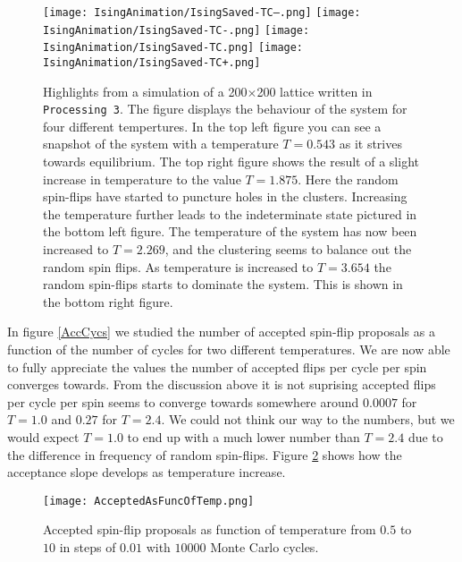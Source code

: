 \documentclass[twoside,utf8]{article}
\begin{document}
\begin{figure}[H]
\begin{center}
\texttt{[image: IsingAnimation/IsingSaved-TC--.png]}
\texttt{[image: IsingAnimation/IsingSaved-TC-.png]}
\texttt{[image: IsingAnimation/IsingSaved-TC.png]}
\texttt{[image: IsingAnimation/IsingSaved-TC+.png]}
\end{center}
\caption{
Highlights from a simulation of a 200$\times$200 lattice written in \texttt{Processing 3}. The figure displays the behaviour of the system for four different tempertures. In the top left figure you can see a snapshot of the system with a temperature $T=0.543$ as it strives towards equilibrium. The top right figure shows the result of a slight increase in temperature to the value $T=1.875$. Here the random spin-flips have started to puncture holes in the clusters. Increasing the temperature further leads to the indeterminate state pictured in the bottom left figure. The temperature of the system has now been increased to $T=2.269$, and the clustering seems to balance out the random spin flips. As temperature is increased to $T=3.654$ the random spin-flips starts to dominate the system. This is shown in the bottom right figure.
}
\label{Processing}
\end{figure}


\noindent
In figure \ref*{AccCycs} we studied the number of accepted spin-flip proposals as a function of the number of cycles for two different temperatures. We are now able to fully appreciate the values the number of accepted flips per cycle per spin converges towards. From the discussion above it is not suprising accepted flips per cycle per spin seems to converge towards somewhere around $0.0007$ for $T=1.0$ and $0.27$ for $T=2.4$. We could not think our way to the numbers, but we would expect $T=1.0$ to end up with a much lower number than $T=2.4$ due to the difference in frequency of random spin-flips. Figure \ref*{AcceptedAsFuncOfTemp} shows how the acceptance slope develops as temperature increase. 




\begin{figure}[H]
\begin{center}
\texttt{[image: AcceptedAsFuncOfTemp.png]}
\end{center}
\caption{
Accepted spin-flip proposals as function of temperature from $0.5$ to $10$ in steps of $0.01$ with $10000$ Monte Carlo cycles.
}
\label{AcceptedAsFuncOfTemp}
\end{figure}
\end{document}
